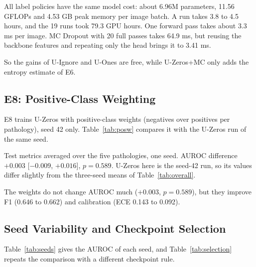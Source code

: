 \documentclass[conference]{IEEEtran}
\begin{document}
All label policies have the same model cost: about 6.96M parameters, 11.56 GFLOPs and 4.53 GB peak memory per image batch. A run takes 3.8 to 4.5 hours, and the 19 runs took 79.3 GPU hours. One forward pass takes about 3.3 ms per image. MC Dropout with 20 full passes takes 64.9 ms, but reusing the backbone features and repeating only the head brings it to 3.41 ms.

So the gains of U-Ignore and U-Ones are free, while U-Zeros+MC only adds the entropy estimate of E6.

\subsection{E8: Positive-Class Weighting}

E8 trains U-Zeros with positive-class weights (negatives over positives per pathology), seed 42 only. Table~\ref{tab:posw} compares it with the U-Zeros run of the same seed.

\begin{table}[!t]
\centering
\caption{Positive-Class Weights on the U-Zeros Baseline (E8, Seed 42)}
\label{tab:posw}
\footnotesize
{}
\par\smallskip
\parbox{\columnwidth}{\footnotesize Test metrics averaged over the five pathologies, one seed. AUROC difference $+0.003$ [$-0.009$, $+0.016$], $p = 0.589$. U-Zeros here is the seed-42 run, so its values differ slightly from the three-seed means of Table~\ref{tab:overall}.}
\end{table}

The weights do not change AUROC much ($+0.003$, $p = 0.589$), but they improve F1 (0.646 to 0.662) and calibration (ECE 0.143 to 0.092).

\subsection{Seed Variability and Checkpoint Selection}

Table~\ref{tab:seeds} gives the AUROC of each seed, and Table~\ref{tab:selection} repeats the comparison with a different checkpoint rule.
\end{document}
